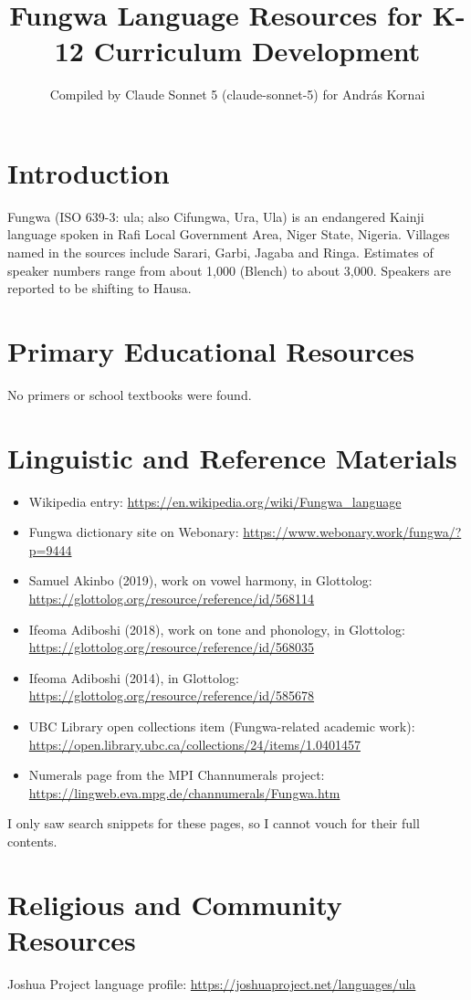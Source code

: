 \documentclass[12pt]{article}
\title{Fungwa Language Resources for K-12 Curriculum Development}
\author{Compiled by Claude Sonnet 5 (claude-sonnet-5) for Andr\'as Kornai}
\date{}
\begin{document}
\maketitle

\section{Introduction}
Fungwa (ISO 639-3: ula; also Cifungwa, Ura, Ula) is an endangered Kainji language spoken in Rafi Local Government Area, Niger State, Nigeria. Villages named in the sources include Sarari, Garbi, Jagaba and Ringa. Estimates of speaker numbers range from about 1,000 (Blench) to about 3,000. Speakers are reported to be shifting to Hausa.

\section{Primary Educational Resources}
No primers or school textbooks were found.

\section{Linguistic and Reference Materials}
\begin{itemize}
\item Wikipedia entry: \url{https://en.wikipedia.org/wiki/Fungwa_language}
\item Fungwa dictionary site on Webonary: \url{https://www.webonary.work/fungwa/?p=9444}
\item Samuel Akinbo (2019), work on vowel harmony, in Glottolog: \url{https://glottolog.org/resource/reference/id/568114}
\item Ifeoma Adiboshi (2018), work on tone and phonology, in Glottolog: \url{https://glottolog.org/resource/reference/id/568035}
\item Ifeoma Adiboshi (2014), in Glottolog: \url{https://glottolog.org/resource/reference/id/585678}
\item UBC Library open collections item (Fungwa-related academic work): \url{https://open.library.ubc.ca/collections/24/items/1.0401457}
\item Numerals page from the MPI Channumerals project: \url{https://lingweb.eva.mpg.de/channumerals/Fungwa.htm}
\end{itemize}
I only saw search snippets for these pages, so I cannot vouch for their full contents.

\section{Religious and Community Resources}
Joshua Project language profile: \url{https://joshuaproject.net/languages/ula}
\end{document}
